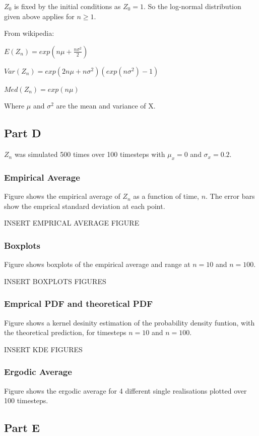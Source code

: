 \documentclass{article}
\begin{document}
$Z_0$ is fixed by the initial conditions as $Z_0=1$. So the log-normal distribution given above applies for $n \geq 1$.

\bigskip

From wikipedia: 

$E(Z_n) = exp(n\mu + \frac{n\sigma^2}{2})$

$Var(Z_n) = exp(2n \mu + n\sigma^2)(exp(n\sigma^2)-1)$

$Med(Z_n) = exp(n\mu)$

Where $\mu$ and $\sigma^2$ are the mean and variance of X.

\subsection{Part D}
$Z_n$ was simulated 500 times over 100 timesteps with $\mu_x=0$ and $\sigma_x=0.2$. 

\subsubsection{Empirical Average}
Figure shows the empirical average of $Z_n$ as a function of time, $n$. The error bars show the emprical standard deviation at each point.

INSERT EMPRICAL AVERAGE FIGURE

\subsubsection{Boxplots}
Figure shows boxplots of the empirical average and range at $n=10$ and $n=100$. 

INSERT BOXPLOTS FIGURES

\subsubsection{Emprical PDF and theoretical PDF}
Figure shows a kernel desinity estimation of the probability density funtion, with the theoretical prediction, for timesteps $n=10$ and $n=100$. 

INSERT KDE FIGURES

\subsubsection{Ergodic Average}
Figure shows the ergodic average for 4 different single realisations plotted over 100 timesteps. 

\subsection{Part E}
\end{document}
